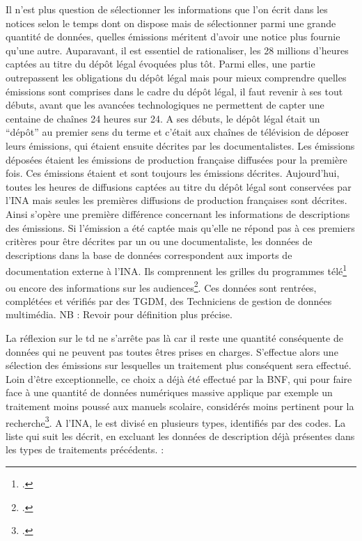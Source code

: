 Il n’est plus question de sélectionner les informations que l’on écrit dans les notices selon le temps dont on dispose mais de sélectionner parmi une grande quantité de données, quelles émissions méritent d’avoir une notice plus fournie qu’une autre. Auparavant, il est essentiel de rationaliser, les 28 millions d’heures captées au titre du dépôt légal évoquées plus tôt. Parmi elles, une partie outrepassent les obligations du dépôt légal mais pour mieux comprendre quelles émissions sont comprises dans le cadre du dépôt légal, il faut revenir à ses tout débuts, avant que les avancées technologiques ne permettent de capter une centaine de chaînes 24 heures sur 24. A ses débuts, le dépôt légal était un \enquote{dépôt} au premier sens du terme et c’était aux chaînes de télévision de déposer leurs émissions, qui étaient ensuite décrites par les documentalistes. Les émissions déposées étaient les émissions de production française diffusées pour la première fois. Ces émissions étaient et sont toujours les émissions décrites. Aujourd’hui, toutes les heures de diffusions captées au titre du dépôt légal sont conservées par l’INA mais seules les premières diffusions de production françaises sont décrites. Ainsi s’opère une première différence concernant les informations de descriptions des émissions. Si l’émission a été captée mais qu’elle ne répond pas à ces premiers critères pour être décrites par un ou une documentaliste, les données de descriptions dans la base de données correspondent aux imports de documentation externe à l’INA. Ils comprennent les grilles du programmes télé\footcite[Pour exemple :][]{admin} ou encore des informations sur les audiences\footcite[Pour exemple :][]{sensio}. Ces données sont rentrées, complétées et vérifiés par des TGDM, des Techniciens de gestion de données multimédia. NB : Revoir pour définition plus précise. 

La réflexion sur le \gls{td} ne s’arrête pas là car il reste une quantité conséquente de données qui ne peuvent pas toutes êtres prises en charges. S’effectue alors une sélection des émissions sur lesquelles un traitement plus conséquent sera effectué. Loin d’être exceptionnelle, ce choix a déjà été effectué par la BNF, qui pour faire face à une quantité de données numériques massive applique par exemple un traitement moins poussé aux manuels scolaire, considérés moins pertinent pour la recherche\footcite[][70]{bermès2024}. A l’INA, le  est divisé en plusieurs types, identifiés par des codes. La liste qui suit les décrit, en excluant les données de description déjà présentes dans les types de traitements précédents. :


